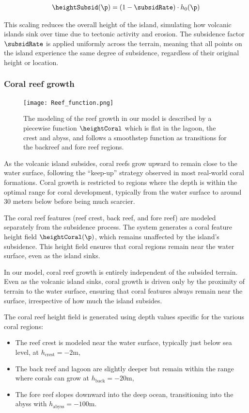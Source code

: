 \begin{align}
    \heightSubsid(\p) = (1 - \subsidRate) \cdot h_0(\p)
\end{align}

This scaling reduces the overall height of the island, simulating how volcanic islands sink over time due to tectonic activity and erosion. The subsidence factor $\subsidRate$ is applied uniformly across the terrain, meaning that all points on the island experience the same degree of subsidence, regardless of their original height or location.

\subsubsection{Coral reef growth}

\begin{figure}[H]
    \texttt{[image: Reef\_function.png]}
    \caption{The modeling of the reef growth in our model is described by a piecewise function $\heightCoral$ which is flat in the lagoon, the crest and abyss, and follows a smoothstep function as transitions for the backreef and fore reef regions. }
    \label{fig:coral-island_reef-function}
\end{figure}

As the volcanic island subsides, coral reefs grow upward to remain close to the water surface, following the “keep-up” strategy observed in most real-world coral formations. Coral growth is restricted to regions where the depth is within the optimal range for coral development, typically from the water surface to around 30 meters below before being much scarcier.

The coral reef features (reef crest, back reef, and fore reef) are modeled separately from the subsidence process. The system generates a coral feature height field $\heightCoral(\p)$, which remains unaffected by the island's subsidence. This height field ensures that coral regions remain near the water surface, even as the island sinks.

In our model, coral reef growth is entirely independent of the subsided terrain. Even as the volcanic island sinks, coral growth is driven only by the proximity of terrain to the water surface, ensuring that coral features always remain near the surface, irrespective of how much the island subsides.

    The coral reef height field is generated using depth values specific for the various coral regions:
    \begin{itemize}
        \item The reef crest is modeled near the water surface, typically just below sea level, at $h_\text{crest} = -2$m,
        \item The back reef and lagoon are slightly deeper but remain within the range where corals can grow at $h_\text{back} = -20$m,
        \item The fore reef slopes downward into the deep ocean, transitioning into the abyss with $h_\text{abyss} = -100$m.
    \end{itemize}

